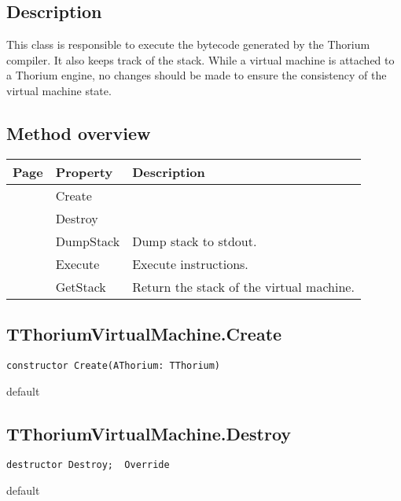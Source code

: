\subsection{Description}
This class is responsible to execute the bytecode generated by the Thorium compiler. It also keeps track of the stack. While a virtual machine is attached to a Thorium engine, no changes should be made to ensure the consistency of the virtual machine state.%
\subsection{Method overview}
\label{thoriumcorepkg:thorium:tthoriumvirtualmachine:methods}
\begin{tabularx}{\textwidth}{llX}
Page & Property & Description  \\ \hline
\pageref{thoriumcorepkg:thorium:tthoriumvirtualmachine:create} & Create  &  \\
\pageref{thoriumcorepkg:thorium:tthoriumvirtualmachine:destroy} & Destroy  &  \\
\pageref{thoriumcorepkg:thorium:tthoriumvirtualmachine:dumpstack} & DumpStack  & Dump stack to stdout. \\
\pageref{thoriumcorepkg:thorium:tthoriumvirtualmachine:execute} & Execute  & Execute instructions. \\
\pageref{thoriumcorepkg:thorium:tthoriumvirtualmachine:getstack} & GetStack  & Return the stack of the virtual machine. \\
\hline
\end{tabularx}
\subsection{TThoriumVirtualMachine.Create}
\label{thoriumcorepkg:thorium:tthoriumvirtualmachine:create}
\begin{FPCList}
\Declaration 

\begin{verbatim}
constructor Create(AThorium: TThorium)
\end{verbatim}
\Visibility
default
\end{FPCList}
\subsection{TThoriumVirtualMachine.Destroy}
\label{thoriumcorepkg:thorium:tthoriumvirtualmachine:destroy}
\begin{FPCList}
\Declaration 

\begin{verbatim}
destructor Destroy;  Override
\end{verbatim}
\Visibility
default
\end{FPCList}
